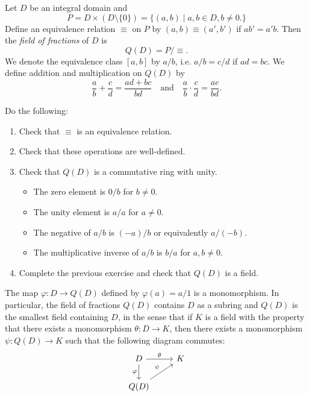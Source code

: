 \begin{definition}
  Let $D$ be an integral domain and
  \[P = D \times (D \setminus \{0\})
    = \{(a, b) \mid a, b \in D, b \ne 0.\}
  \]
  Define an equivalence relation $\equiv$ on $P$ by
  $(a, b) \equiv (a', b')$ if $ab' = a'b$. Then
  the \emph{field of fractions} of $D$ is
  \[
    Q(D) = P / {\equiv}.
  \]
  We denote the equivalence class $[a, b]$ by
  $a / b$, i.e. $a / b = c / d$ if $ad = bc$. We
  define addition and multiplication on $Q(D)$ by
\[
  \frac{a}{b} + \frac{c}{d} = \frac{ad + bc}{bd} \quad
  \text{and} \quad
  \frac{a}{b} \cdot \frac{c}{d} = \frac{ac}{bd}.
  \]
\end{definition}

\begin{exercise}
  Do the following:
  \begin{enumerate}
    \item Check that $\equiv$ is an equivalence relation.
    \item Check that these operations are well-defined.
    \item Check that $Q(D)$ is a commutative ring with unity.
      \begin{itemize}
        \item The zero element is $0 / b$ for $b \ne 0$.
        \item The unity element is $a / a$ for $a \ne 0$.
        \item The negative of $a / b$ is $(-a) / b$
          or equivalently $a / (-b)$.
        \item The multiplicative inverse of $a / b$ is
          $b / a$ for $a, b \ne 0$.
      \end{itemize}
    \item Complete the previous exercise and check that
      $Q(D)$ is a field.
  \end{enumerate}
\end{exercise}

\begin{exercise}
  The map $\varphi : D \to Q(D)$ defined by
  $\varphi(a) = a / 1$ is a monomorphism. In particular,
  the field of fractions
  $Q(D)$ contains $D$ as a subring and $Q(D)$ is
  the smallest field containing $D$, in the sense that
  if $K$ is a field with the property that there exists
  a monomorphism $\theta : D \to K$, then there exists
  a monomorphism $\psi : Q(D) \to K$ such that the
  following diagram commutes:
  \[
    \begin{tikzcd}
      D \arrow{r}{\theta} \arrow[swap]{d}{\varphi}
      & K \\
      Q(D) \arrow{ur}{\psi}
    \end{tikzcd}
  \]
\end{exercise}


